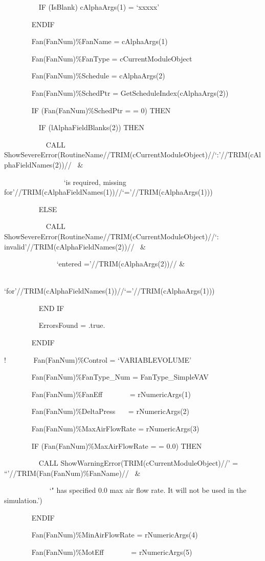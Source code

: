 ~~~~~~~~~ IF (IsBlank) cAlphaArgs(1) = `xxxxx'

~~~~~~~ ENDIF

~~~~~~~ Fan(FanNum)\%FanName = cAlphaArgs(1)

~~~~~~~ Fan(FanNum)\%FanType = cCurrentModuleObject

~~~~~~~ Fan(FanNum)\%Schedule = cAlphaArgs(2)

~~~~~~~ Fan(FanNum)\%SchedPtr = GetScheduleIndex(cAlphaArgs(2))

~~~~~~~ IF (Fan(FanNum)\%SchedPtr = = 0) THEN

~~~~~~~~~ IF (lAlphaFieldBlanks(2)) THEN

~~~~~~~~~~~ CALL ShowSevereError(RoutineName//TRIM(cCurrentModuleObject)//`:'//TRIM(cAlphaFieldNames(2))//~ \&

~~~~~~~~~~~~~~~~ `is required, missing for'//TRIM(cAlphaFieldNames(1))//`='//TRIM(cAlphaArgs(1)))

~~~~~~~~~ ELSE

~~~~~~~~~~~ CALL ShowSevereError(RoutineName//TRIM(cCurrentModuleObject)//`: invalid'//TRIM(cAlphaFieldNames(2))//~ \&

~~~~~~~~~~~~~~ `entered ='//TRIM(cAlphaArgs(2))// \&

~~~~~~~~~~~~~~ `for'//TRIM(cAlphaFieldNames(1))//`='//TRIM(cAlphaArgs(1)))

~~~~~~~~~ END IF

~~~~~~~~~ ErrorsFound = .true.

~~~~~~~ ENDIF

!~~~~~~~ Fan(FanNum)\%Control = `VARIABLEVOLUME'

~~~~~~~ Fan(FanNum)\%FanType\_Num = FanType\_SimpleVAV

~~~~~~~ Fan(FanNum)\%FanEff~~~~~~~ = rNumericArgs(1)

~~~~~~~ Fan(FanNum)\%DeltaPress~~~ = rNumericArgs(2)

~~~~~~~ Fan(FanNum)\%MaxAirFlowRate = rNumericArgs(3)

~~~~~~~ IF (Fan(FanNum)\%MaxAirFlowRate = = 0.0) THEN

~~~~~~~~~ CALL ShowWarningError(TRIM(cCurrentModuleObject)//' = ``'//TRIM(Fan(FanNum)\%FanName)//~ \&

~~~~~~~~~~~~ `" has specified 0.0 max air flow rate. It will not be used in the simulation.')

~~~~~~~ ENDIF

~~~~~~~ Fan(FanNum)\%MinAirFlowRate = rNumericArgs(4)

~~~~~~~ Fan(FanNum)\%MotEff~~~~~~~ = rNumericArgs(5)

